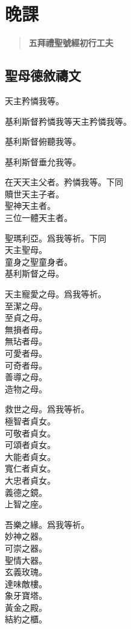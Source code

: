 \chapter{晚課}
\begin{quote}
\bfseries 五拜禮\quad 聖號經\quad 初行工夫
\end{quote}

\section*{聖母德敘禱文}
\versicle 天主矜憐我等。

\Response 基利斯督矜憐我等\hfill 天主矜憐我等。

\versicle 基利斯督俯聽我等。

\Response 基利斯督垂允我等。

\versicle 在天天主父者。\hfill \response 矜憐我等。{\small 下同}\\
贖世天主子者。\\
聖神天主者。\\
三位一體天主者。

\versicle 聖瑪利亞。\hfill \response 爲我等祈。{\small 下同}\\
天主聖母。\\
童身之聖童身者。\\
基利斯督之母。

\versicle 天主寵愛之母。\hfill \response 爲我等祈。\\
至潔之母。\\
至貞之母。\\
無損者母。\\
無玷者母。\\
可愛者母。\\
可奇者母。\\
善導之母。\\
造物之母。

\versicle 救世之母。\hfill \response 爲我等祈。\\
極智者貞女。\\
可敬者貞女。\\
可頌者貞女。\\
大能者貞女。\\
寬仁者貞女。\\
大忠者貞女。\\
義德之鏡。\\
上智之座。

\versicle 吾樂之緣。\hfill \response 爲我等祈。\\
妙神之器。\\
可崇之器。\\
聖情大器。\\
玄義玫瑰。\\
達味敵樓。\\
象牙寶塔。\\
黃金之殿。\\
結約之櫃。

